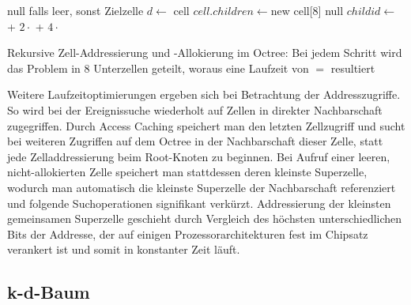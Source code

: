 \begin{algorithm}
  \begin{algorithmic}
    \Result null falls leer, sonst Zielzelle
    \State
    \State $d \gets $
    \State\Return cell
    \EndIf
    \State $cell.children \gets $new cell[8]
    \Else
    \State \Return null
    \EndIf
    \EndIf
    \State $childid \gets $
    + $2\cdot$
    + $4\cdot$
    \State \Return{}
    \EndFunction
  \end{algorithmic}
  \caption[Zell-Addressierung in Octrees]{Rekursive Zell-Addressierung und -Allokierung im Octree: Bei jedem Schritt wird das Problem in 8 Unterzellen geteilt, woraus eine Laufzeit von $=$ resultiert}
  \label{algo:octree-adressing}
\end{algorithm}

Weitere Laufzeitoptimierungen ergeben sich bei Betrachtung der Addresszugriffe.
So wird bei der Ereignissuche wiederholt auf Zellen in direkter Nachbarschaft zugegriffen.
Durch Access Caching speichert man den letzten Zellzugriff und sucht bei weiteren Zugriffen auf dem Octree in der Nachbarschaft dieser Zelle, statt jede Zelladdressierung beim Root-Knoten zu beginnen.
Bei Aufruf einer leeren, nicht-allokierten Zelle speichert man stattdessen deren kleinste Superzelle, wodurch man automatisch die kleinste Superzelle der Nachbarschaft referenziert und folgende Suchoperationen signifikant verkürzt.
Addressierung der kleinsten gemeinsamen Superzelle geschieht durch Vergleich des höchsten unterschiedlichen Bits der Addresse, der auf einigen Prozessorarchitekturen fest im Chipsatz verankert ist und somit in konstanter Zeit läuft.


\subsection{k-d-Baum}

